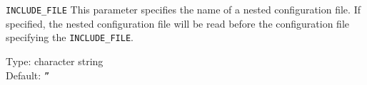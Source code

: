 \begin{keydescription}{\texttt{INCLUDE\_FILE}}
This parameter specifies the name of a nested configuration file. If specified,
the nested configuration file will be read before the configuration file
specifying the \texttt{INCLUDE\_FILE}.
\begin{keytab}
   Type:    \> character string \\
   Default: \> \texttt{''} 
    
\end{keytab}
\end{keydescription}

